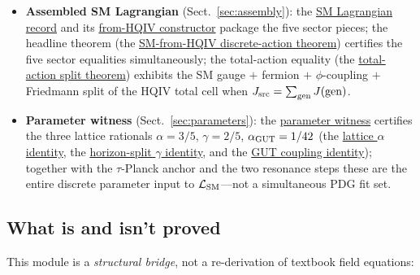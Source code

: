 \documentclass[11pt]{amsart}
\begin{document}
\begin{itemize}[leftmargin=2em]
\item \textbf{Assembled SM Lagrangian} (Sect.~\ref{sec:assembly}):
  the \hyperref[lean:SM-record]{SM Lagrangian record} and its
  \hyperref[lean:SM-fromHQIV]{from-HQIV constructor} package the five
  sector pieces; the headline theorem (the
  \hyperref[lean:headline]{SM-from-HQIV discrete-action theorem})
  certifies the five sector equalities simultaneously; the total-action
  equality (the
  \hyperref[lean:total-split]{total-action split theorem}) exhibits the
  SM gauge $+$ fermion $+$ $\phi$-coupling $+$ Friedmann split of the HQIV
  total cell when $J_{\rm src}=\sum_{\rm gen} J(\rm gen)$.
\item \textbf{Parameter witness} (Sect.~\ref{sec:parameters}):
  the \hyperref[lean:param-witness]{parameter witness} certifies the three
  lattice rationals $\alpha=3/5$, $\gamma=2/5$, $\alpha_{\rm GUT}=1/42$
  (the \hyperref[lean:alpha-35]{lattice $\alpha$ identity}, the
  \hyperref[lean:gamma-25]{horizon-split $\gamma$ identity}, and the
  \hyperref[lean:alpha-gut]{GUT coupling identity}); together with
  the $\tau$-Planck anchor and the two resonance steps these are the
  entire discrete parameter input to $\mathcal{L}_{\rm SM}$---not a
  simultaneous PDG fit set.
\end{itemize}

\subsection{What is and isn't proved}
\label{subsec:not-claimed}

This module is a \emph{structural bridge}, not a re-derivation of textbook
field equations:
\end{document}

